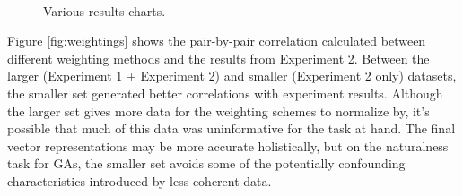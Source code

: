 \documentclass[11pt]{article}
\begin{document}
\begin{figure}[ht]
\begin{center}
~

  \caption{Various results charts.}
  \label{fig:all}
\end{center}
\end{figure}

Figure \ref{fig:weightings} shows the pair-by-pair correlation calculated between different weighting methods and the results from Experiment 2. Between the larger (Experiment 1 + Experiment 2) and smaller (Experiment 2 only) datasets, the smaller set generated better correlations with experiment results. Although the larger set gives more data for the weighting schemes to normalize by, it's possible that much of this data was uninformative for the task at hand. The final vector representations may be more accurate holistically, but on the naturalness task for GAs, the smaller set avoids some of the potentially confounding characteristics introduced by less coherent data.
\end{document}

